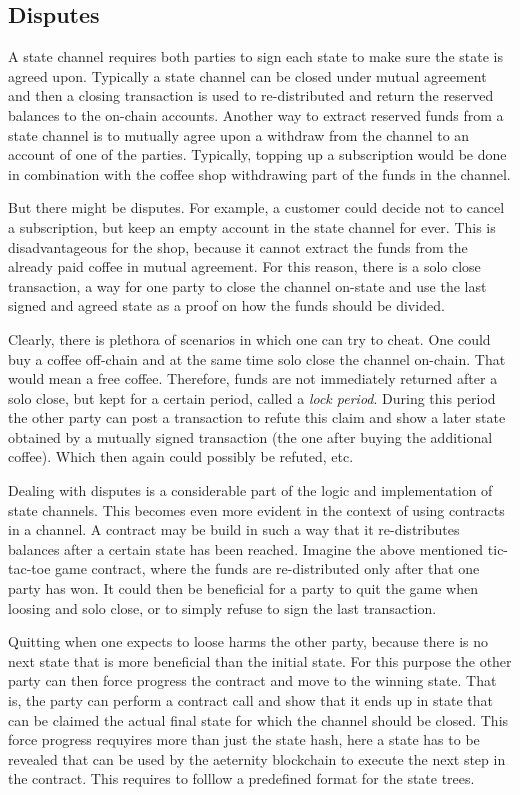 \subsection{Disputes}

A state channel requires both parties to sign each state to make
sure the state is agreed upon. Typically a state channel can be closed
under mutual agreement and then a closing transaction is used to
re-distributed and return the reserved balances to the on-chain
accounts. Another way to extract reserved funds from a state channel
is to mutually agree upon a withdraw from the channel to an account of
one of the parties. Typically, topping up a subscription would be done
in combination with the coffee shop withdrawing part of the funds in
the channel.

But there might be disputes. For example, a customer
could decide not to cancel a subscription, but keep an empty account
in the state channel for ever. This is disadvantageous for the shop,
because it cannot extract the funds from the already paid coffee in
mutual agreement. For this reason, there is a solo close transaction,
a way for one party to close the channel on-state and use the last
signed and agreed state as a proof on how the funds should be divided.

Clearly, there is plethora of scenarios in which one can try to
cheat. One could buy a coffee off-chain and at the same time solo
close the channel on-chain. That would mean a free coffee. Therefore,
funds are not immediately returned after a solo close, but kept for a
certain period, called a \textit{lock period}. During this period the
other party can post a transaction to refute this claim and show a
later state obtained by a mutually signed transaction (the one after
buying the additional coffee). Which then again could possibly be
refuted, etc.

Dealing with disputes is a considerable part of the logic and
implementation of state channels. This becomes even more evident in
the context of using contracts in a channel. A contract may be build
in such a way that it re-distributes balances after a certain state has
been reached. Imagine the above mentioned tic-tac-toe game contract,
where the funds are re-distributed only after that one party has
won. It could then be beneficial for a party to quit the
game when loosing and solo close, or to simply refuse to sign the last
transaction.

Quitting when one expects to loose
harms the other party, because there is no next state that is more
beneficial than the initial state. For this purpose the other party
can then force progress the contract and move to the winning
state. That is, the party can perform a contract call and show that it
ends up in state that can be claimed the actual final state for which
the channel should be closed. This force progress requyires more than
just the state hash, here a state has to be revealed that can be used
by the aeternity blockchain to execute the next step in the
contract. This requires to folllow a predefined format for the state trees.

